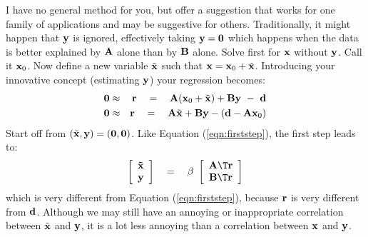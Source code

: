 \par
I have no general method for you,
but offer a suggestion that works for one family of applications
and may be suggestive for others.
Traditionally, it might happen
that $\bold y$ is ignored,
effectively taking $\bold y=\bold 0$
which happens when the data is better explained by $\bold A$ alone than by  $\bold B$ alone.
Solve first for $\bold x$ without $\bold y$.
Call it $\bold x_0$.
Now define a new variable
$\tilde {\bold x}$ such that
$\bold x = \bold x_0 +\tilde {\bold x}$.
Introducing your innovative concept (estimating $\bold y$) your regression becomes:
\begin{eqnarray}
\bold 0 &\approx & \bold r 
\quad = \quad
\bold A ( \bold x_0 +\tilde {\bold x}) + \bold B \bold y \ -\ \bold d
\\
\bold 0 &\approx & \bold r 
\quad = \quad
\bold A \tilde {\bold x} + \bold B \bold y - (\bold d -\bold A\bold x_0)
\end{eqnarray}
Start off from
$(\tilde{\bold x},\bold y)=(\bold 0,\bold 0)$.
Like Equation (\ref{eqn:firststep}),
the first step leads to:
\begin{equation}
\left[
        \begin{array}{c}
                \bold {\tilde x} \\ \bold y
        \end{array}
\right]
\quad=\quad
\beta\ 
\left[
        \begin{array}{c}
                \bold A\T \bold r
                \\
                \bold B\T \bold r
        \end{array}
\right]
\end{equation}
which is very different
from Equation (\ref{eqn:firststep}),
because $\bold r$ is very different from $\bold d$.
Although we may still have an annoying or inappropriate
correlation between $\tilde{\bold x}$ and $\bold y$,
it is a lot less annoying than a correlation between
$\bold x$ and $\bold y$.

